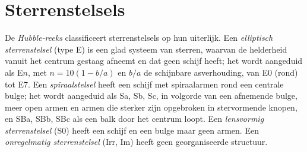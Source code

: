 \section{Sterrenstelsels}\label{sec:b3:milky-way-galaxies:galaxies}

\begin{definition}\label{def:b3:milky-way-galaxies:types}
De \emph{Hubble-reeks} classificeert sterrenstelsels op
hun uiterlijk. Een \emph{elliptisch sterrenstelsel}
(type E) is een glad systeem van sterren, waarvan de helderheid vanuit het centrum
gestaag afneemt en dat geen schijf heeft; het wordt aangeduid als E$n$, met $n = 10(1 - b/a)$
en $b/a$ de schijnbare asverhouding, van E0 (rond) tot E7. Een
\emph{spiraalstelsel} heeft een schijf met spiraalarmen
rond een centrale bulge; het wordt aangeduid als Sa, Sb, Sc, in volgorde van een afnemende
bulge, meer open armen en armen die sterker zijn opgebroken in stervormende knopen, en
SBa, SBb, SBc als een balk door het centrum loopt. Een \emph{lensvormig
sterrenstelsel} (S0) heeft een schijf en een bulge maar geen armen.
Een \emph{onregelmatig sterrenstelsel} (Irr, Im) heeft geen
georganiseerde structuur.
\end{definition}

